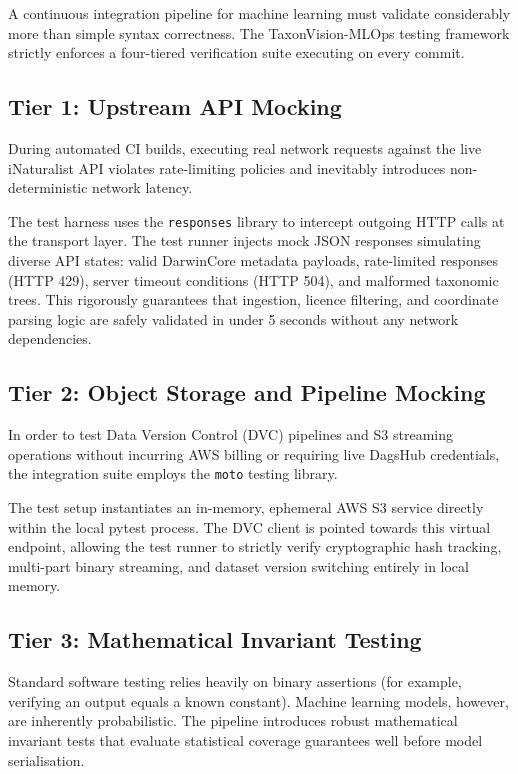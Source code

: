 A continuous integration pipeline for machine learning must validate considerably more than simple syntax correctness. The TaxonVision-MLOps testing framework strictly enforces a four-tiered verification suite executing on every commit.

\subsection{Tier 1: Upstream API Mocking}
During automated CI builds, executing real network requests against the live iNaturalist API violates rate-limiting policies and inevitably introduces non-deterministic network latency.

The test harness uses the \texttt{responses} library to intercept outgoing HTTP calls at the transport layer. The test runner injects mock JSON responses simulating diverse API states: valid DarwinCore metadata payloads, rate-limited responses (HTTP 429), server timeout conditions (HTTP 504), and malformed taxonomic trees. This rigorously guarantees that ingestion, licence filtering, and coordinate parsing logic are safely validated in under 5 seconds without any network dependencies.

\subsection{Tier 2: Object Storage and Pipeline Mocking}
In order to test Data Version Control (DVC) pipelines and S3 streaming operations without incurring AWS billing or requiring live DagsHub credentials, the integration suite employs the \texttt{moto} testing library.

The test setup instantiates an in-memory, ephemeral AWS S3 service directly within the local pytest process. The DVC client is pointed towards this virtual endpoint, allowing the test runner to strictly verify cryptographic hash tracking, multi-part binary streaming, and dataset version switching entirely in local memory.

\subsection{Tier 3: Mathematical Invariant Testing}
Standard software testing relies heavily on binary assertions (for example, verifying an output equals a known constant). Machine learning models, however, are inherently probabilistic. The pipeline introduces robust mathematical invariant tests that evaluate statistical coverage guarantees well before model serialisation.

